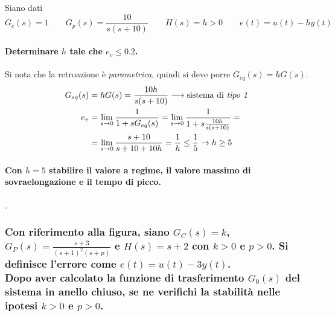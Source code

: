 \exercise{}
Siano dati
\[
	G_c(s) = 1 \qquad G_p(s) = \frac{10}{s(s+10)} \qquad
	H(s) = h > 0 \qquad e(t) = u(t) -hy(t)
\]
\paragraph{Determinare \(h\) tale che \(e_v\leq0.2\).}
Si nota che la retroazione è \emph{parametrica}, quindi si deve porre \(G_{eq}(s)=hG(s)\).
\begin{align*}
	G_{eq}(s) &= hG(s) = \frac{10h}{s(s+10)} \longrightarrow \text{sistema di \emph{tipo 1}} \\
	e_v &= \lim_{s\to0} \frac{1}{1+sG_{eq}(s)} =
		\lim_{s\to0} \frac{1}{1+s\frac{10h}{s(s+10)}} = \\
	    &= \lim_{s\to0} \frac{s+10}{s+10+10h} =
	    	\frac{1}{h} \leq \frac{1}{5}
	    	\rightarrow h \geq 5
\end{align*}

\paragraph{Con \(h=5\) stabilire il valore a regime, il valore massimo di sovraelongazione e il tempo di picco.}
.

\begin{center}\end{center}

\subsubsection{
Con riferimento alla figura, siano \(G_C(s)=k\), \(\displaystyle G_P(s)=\frac{s+3}{(s+1)^2(s+p)}\) e \(H(s)=s+2\) con \(k>0\) e \(p>0\). Si definisce l'errore come \(e(t)=u(t)-3y(t)\). \\
Dopo aver calcolato la funzione di trasferimento \(G_0(s)\) del sistema in anello chiuso, se ne verifichi la stabilità nelle ipotesi \(k>0\) e \(p>0\).
}

